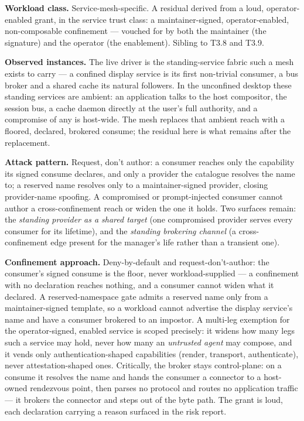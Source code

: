 \textbf{Workload class.} Service-mesh-specific. A residual derived from
a loud, operator-enabled grant, in the service trust class: a
maintainer-signed, operator-enabled, non-composable confinement ---
vouched for by both the maintainer (the signature) and the operator (the
enablement). Sibling to T3.8 and T3.9.

\textbf{Observed instances.} The live driver is the standing-service
fabric such a mesh exists to carry --- a confined display service is its
first non-trivial consumer, a bus broker and a shared cache its natural
followers. In the unconfined desktop these standing services are
ambient: an application talks to the host compositor, the session bus, a
cache daemon directly at the user's full authority, and a compromise of
any is host-wide. The mesh replaces that ambient reach with a floored,
declared, brokered consume; the residual here is what remains after the
replacement.

\textbf{Attack pattern.} Request, don't author: a consumer reaches only
the capability its signed consume declares, and only a provider the
catalogue resolves the name to; a reserved name resolves only to a
maintainer-signed provider, closing provider-name spoofing. A
compromised or prompt-injected consumer cannot author a
cross-confinement reach or widen the one it holds. Two surfaces remain:
the \emph{standing provider as a shared target} (one compromised
provider serves every consumer for its lifetime), and the \emph{standing
brokering channel} (a cross-confinement edge present for the manager's
life rather than a transient one).

\textbf{Confinement approach.} Deny-by-default and request-don't-author:
the consumer's signed consume is the floor, never workload-supplied ---
a confinement with no declaration reaches nothing, and a consumer cannot
widen what it declared. A reserved-namespace gate admits a reserved name
only from a maintainer-signed template, so a workload cannot advertise
the display service's name and have a consumer brokered to an impostor.
A multi-leg exemption for the operator-signed, enabled service is scoped
precisely: it widens how many legs such a service may hold, never how
many an \emph{untrusted agent} may compose, and it vends only
authentication-shaped capabilities (render, transport, authenticate),
never attestation-shaped ones. Critically, the broker stays
control-plane: on a consume it resolves the name and hands the consumer
a connector to a host-owned rendezvous point, then parses no protocol
and routes no application traffic --- it brokers the connector and steps
out of the byte path. The grant is loud, each declaration carrying a
reason surfaced in the risk report.

